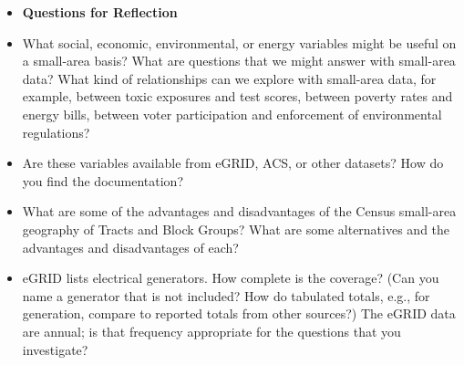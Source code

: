 \documentclass[fleqn, 12pt]{exam}
\begin{document}
    \begin{itemize}
  \item \textbf{Questions for Reflection}
  \item What social, economic, environmental, or energy variables might be useful on a small-area basis? What are questions that we might answer with small-area data? What kind of relationships can we explore with small-area data, for example, between toxic exposures and test scores, between poverty rates and energy bills, between voter participation and enforcement of environmental regulations?
  \item Are these variables available from eGRID, ACS, or other datasets? How do you find the documentation?
  \item What are some of the advantages and disadvantages of the Census small-area geography of Tracts and Block Groups? What are some alternatives and the advantages and disadvantages of each?
  \item eGRID lists electrical generators.  How complete is the coverage? (Can you name a generator that is not included? How do tabulated totals, e.g., for generation, compare to reported totals from other sources?)  The eGRID data are annual; is that frequency appropriate for the questions that you investigate?
  \end{itemize}
  
\end{document}
